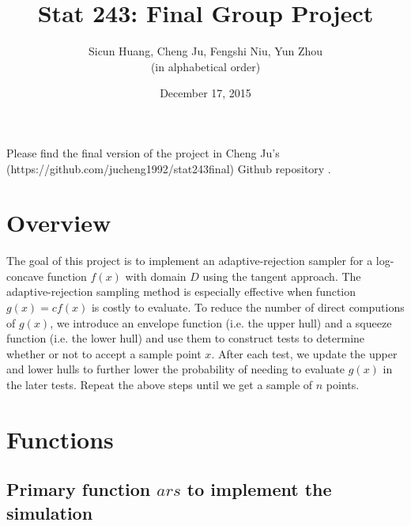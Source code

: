 \documentclass{article}\usepackage[]{graphicx}\usepackage[]{color}
\begin{document}


\title{Stat 243: Final Group Project}
\author{Sicun Huang, Cheng Ju, Fengshi Niu, Yun Zhou\\ 
        \small(in alphabetical order)}
\date{December 17, 2015}
\maketitle



Please find the final version of the project in Cheng Ju's (https://github.com/jucheng1992/stat243final) Github repository .

\section{Overview}

The goal of this project is to implement an adaptive-rejection sampler for a log-concave function $f(x)$ with domain $D$ using the tangent approach. The adaptive-rejection sampling method is especially effective when function $g(x)=cf(x)$ is costly to evaluate. To reduce the number of direct computions of $g(x)$, we introduce an envelope function (i.e. the upper hull) and a squeeze function (i.e. the lower hull) and use them to construct tests to determine whether or not to accept a sample point $x$. After each test, we update the upper and lower hulls to further lower the probability of needing to evaluate $g(x)$ in the later tests. Repeat the above steps until we get a sample of $n$ points.

\section{Functions}

\subsection{Primary function $ars$ to implement the simulation}
\end{document}
